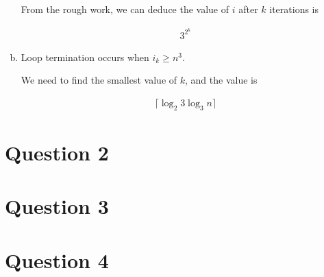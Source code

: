 \documentclass[12pt]{article}
\begin{document}
\begin{enumerate}[a.]
    From the rough work, we can deduce the value of $i$ after $k$ iterations
    is

    \setcounter{equation}{0}
    \begin{align}
        3^{2^k}
    \end{align}

    \item

    Loop termination occurs when $i_k \geq n^3$.

    \bigskip

    We need to find the smallest value of $k$, and the value is

    \setcounter{equation}{0}
    \begin{align}
        \lceil \log_2 3\log_3 n \rceil
    \end{align}

\end{enumerate}

\section*{Question 2}

\section*{Question 3}

\section*{Question 4}
\end{document}
